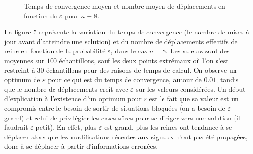 \documentclass[11pt, openany]{article}
\begin{document}
\begin{figure}
  \centering
  \caption{Temps de convergence moyen et nombre moyen de déplacements en fonction de $\varepsilon$ pour $n=8$.}
\end{figure}   

La figure $5$ représente la variation du temps de convergence (le nombre de mises à jour avant d'atteindre une solution) et du nombre de déplacements effectifs de reine en fonction de la probabilité $\varepsilon$, dans le cas $n=8$. Les valeurs sont des moyennes sur $100$ échantillons, sauf les deux points extrémaux où l'on s'est restreint à $30$ échantillons pour des raisons de temps de calcul. On observe un optimum de $\varepsilon$ pour ce qui est du temps de convergence, autour de $0.01$, tandis que le nombre de déplacements croît avec $\varepsilon$ sur les valeurs considérées. Un début d'explication à l'existence d'un optimum pour $\varepsilon$ est le fait que sa valeur est un compromis entre le besoin de sortir de situations bloquées (on a besoin de $\varepsilon$ grand) et celui de privilégier les cases sûres pour se diriger vers une solution (il faudrait $\varepsilon$ petit). En effet, plus $\varepsilon$ est grand, plus les reines ont tendance à se déplacer alors que les modifications récentes aux signaux n'ont pas été propagées, donc à se déplacer à partir d'informations erronées.
\end{document}
